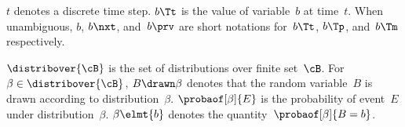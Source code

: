 \(t\) denotes a discrete time step.
\(b\Tt\) is the value of variable~\(b\) at time~\(t\).
When unambiguous, \(b\), \(b\nxt\), and~\(b\prv\) are short notations for~\(b\Tt\), \(b\Tp\), and~\(b\Tm\) respectively.

\(\distribover{\cB}\) is the set of distributions over finite set~\(\cB\).
For~\(\beta \in \distribover{\cB}\), \(B \drawn \beta\) denotes that the random variable~\(B\) is drawn according to distribution~\(\beta\).
\(\probaof[\beta]{E}\) is the probability of event~\(E\) under distribution~\(\beta\).
\(\beta \elmt {b}\) denotes the quantity~\(\probaof[\beta]{B = b}\).
